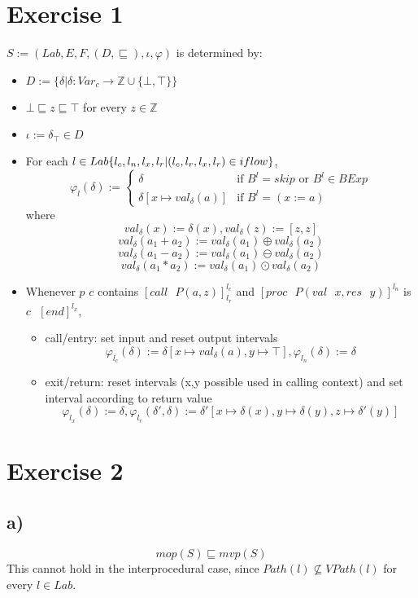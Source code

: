 \documentclass[fleqn,12pt]{article}
\begin{document}
\section*{Exercise 1}
$S:=(Lab,E,F,(D,\sqsubseteq),\iota,\varphi)$ is determined by:
\begin{itemize}
\item $D:=\{\delta | \delta: Var_c \rightarrow \mathbb{Z} \cup \{\bot, \top\}\}$
\item $\bot \sqsubseteq z \sqsubseteq \top$ for every $z \in \mathbb{Z}$
\item $\iota := \delta_{\top} \in D$
\item For each $l \in Lab \\ \{l_c,l_n,l_x,l_r | (l_c,l_r,l_x,l_r) \in iflow\}$,
\[
 \varphi_l(\delta) := 
  \begin{cases} 
   \delta & \text{if } B^{l} = skip \text{ or } B^{l} \in BExp \\
   \delta [x \mapsto val_{\delta}(a)]       & \text{if } B^l = (x:=a)
  \end{cases}
\]
where
$$val_{\delta}(x):=\delta(x), val_{\delta}(z):=[z,z]$$
$$val_{\delta}(a_1+a_2):=val_{\delta}(a_1) \oplus val_{\delta}(a_2)$$
$$val_{\delta}(a_1-a_2):=val_{\delta}(a_1) \ominus val_{\delta}(a_2)$$
$$val_{\delta}(a_1*a_2):=val_{\delta}(a_1) \odot val_{\delta}(a_2)$$
\item Whenever $p$ $c$ contains $[call \text{ } P(a,z)]^{l_c}_{l_r}$ and $[proc \text{ } P(val \text{ } x,res \text{ } y)]^{l_n}$ is $c \text{ } [end]^{l_x}$,
\begin{itemize}
\item call/entry: set input and reset output intervals
$$\varphi_{l_c}(\delta) := \delta [x \mapsto val_{\delta}(a),y \mapsto \top], \varphi_{l_n}(\delta) := \delta$$
\item exit/return: reset intervals (x,y possible used in calling context) and set interval according to return value
$$\varphi_{l_x}(\delta) := \delta, \varphi_{l_r}(\delta ', \delta) := \delta '[x \mapsto \delta(x), y \mapsto \delta(y),z\mapsto \delta '(y)] $$
\end{itemize}
\end{itemize}
\section*{Exercise 2}
\subsection*{a)}
$$mop(S) \sqsubseteq mvp(S)$$
This cannot hold in the interprocedural case, since $Path(l) \nsubseteq VPath(l)$ for every $l \in Lab$.
\end{document}
